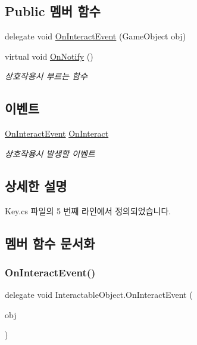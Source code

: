 \subsection*{Public 멤버 함수}
\begin{DoxyCompactItemize}
\item 
delegate void \mbox{\hyperlink{class_interactable_object_a70a579e4b09d53e6cb77b5222189d5eb}{On\+Interact\+Event}} (Game\+Object obj)
\item 
virtual void \mbox{\hyperlink{class_interactable_object_aa5c752d17471fe0daf58a4d00c218a29}{On\+Notify}} ()
\begin{DoxyCompactList}\small\item\em 상호작용시 부르는 함수 \end{DoxyCompactList}\end{DoxyCompactItemize}
\subsection*{이벤트}
\begin{DoxyCompactItemize}
\item 
\mbox{\hyperlink{class_interactable_object_a70a579e4b09d53e6cb77b5222189d5eb}{On\+Interact\+Event}} \mbox{\hyperlink{class_interactable_object_afe5e0b16d86c2ed4abf4a71a1995f7ae}{On\+Interact}}
\begin{DoxyCompactList}\small\item\em 상호작용시 발생할 이벤트 \end{DoxyCompactList}\end{DoxyCompactItemize}


\subsection{상세한 설명}


Key.\+cs 파일의 5 번째 라인에서 정의되었습니다.



\subsection{멤버 함수 문서화}
\mbox{\label{class_interactable_object_a70a579e4b09d53e6cb77b5222189d5eb}} 
\subsubsection{\texorpdfstring{OnInteractEvent()}{OnInteractEvent()}}
{\footnotesize\ttfamily delegate void Interactable\+Object.\+On\+Interact\+Event (\begin{DoxyParamCaption}\item[{Game\+Object}]{obj }\end{DoxyParamCaption})\hspace{0.3cm}{\ttfamily [inherited]}}

